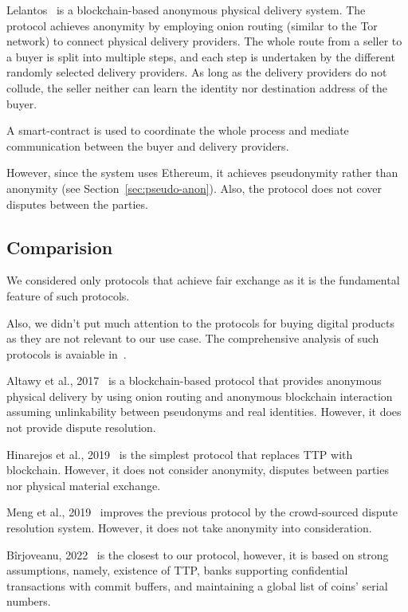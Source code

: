 \documentclass[pdftex,twocolumn,epjc3]{svjour3}
\begin{document}
Lelantos~\cite{altawyLelantosBlockchainBasedAnonymous2017} is a blockchain-based anonymous
physical delivery system. The protocol achieves anonymity by employing onion routing (similar to the Tor network) to connect physical delivery providers. The whole route from a seller to a buyer is split into multiple steps, and each step is undertaken by the different randomly selected delivery providers. As long as the delivery providers do not collude, the seller neither can learn the identity nor destination address of the buyer.

A smart-contract is used to coordinate the whole process and mediate communication between the buyer and delivery providers.

However, since the system uses Ethereum, it achieves pseudonymity rather than anonymity (see Section~\ref{sec:pseudo-anon}). Also, the protocol does not cover disputes between the parties.

\subsection{Comparision}

We considered only protocols that achieve fair exchange as it is the fundamental feature of such protocols.

Also, we didn't put much attention to the protocols for buying digital products as they are not relevant to our use case. The comprehensive analysis of such protocols is avaiable in~\cite{birjoveanuTwoPartyECommerceProtocols2022}.

Altawy et al., 2017~\cite{altawyLelantosBlockchainBasedAnonymous2017} is a blockchain-based protocol that provides anonymous physical delivery by using onion routing and anonymous blockchain interaction assuming unlinkability between pseudonyms and real identities. However, it does not provide dispute resolution.

Hinarejos et al., 2019~\cite{hinarejosSolutionSecureCertified2019} is the simplest protocol that replaces TTP with blockchain. However, it does not consider anonymity, disputes between parties nor physical material exchange.

Meng et al., 2019~\cite{mengThemisDecentralizedEscrow2019} improves the previous protocol by the crowd-sourced dispute resolution system. However, it does not take anonymity into consideration.

Bîrjoveanu, 2022~\cite{birjoveanuTwoPartyECommerceProtocols2022} is the closest to our protocol, however, it is based on strong assumptions, namely, existence of TTP, banks supporting confidential transactions with commit buffers, and maintaining a global list of coins' serial numbers.
\end{document}

